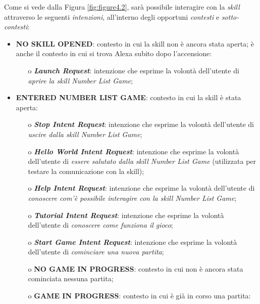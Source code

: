 Come si vede dalla Figura \ref{fig:figure4.2}, sarà possibile interagire con la
\textit{skill} attraverso le seguenti \textit{intenzioni}, all’interno degli
opportuni \textit{contesti} e \textit{sotto-contesti}:
\begin{itemize}
  \item \textbf{NO SKILL OPENED}: contesto in cui la skill non è ancora stata
        aperta; è anche il contesto in cui si trova Alexa subito dopo
        l’accensione:
        \begin{itemize}
          \item[o] \textit{\textbf{Launch Request}}: intenzione che esprime la
                volontà dell’utente di \textit{aprire la skill Number List
                Game};
        \end{itemize}
  \item \textbf{ENTERED NUMBER LIST GAME}: contesto in cui la skill è stata
        aperta:
        \begin{itemize}
          \item[o] \textit{\textbf{Stop Intent Request}}: intenzione che
                esprime la volontà dell’utente di \textit{uscire dalla skill
                Number List Game};
          \item[o] \textit{\textbf{Hello World Intent Request}}: intenzione che
                esprime la volontà dell’utente di \textit{essere salutato dalla
                skill Number List Game} (utilizzata per testare la
                comunicazione con la skill);
          \item[o] \textit{\textbf{Help Intent Request}}: intenzione che
                esprime la volontà dell’utente di \textit{conoscere com’è
                possibile interagire con la skill Number List Game};
          \item[o] \textit{\textbf{Tutorial Intent Request}}: intenzione che
                esprime la volontà dell’utente di \textit{conoscere come
                funziona il gioco};
          \item[o] \textit{\textbf{Start Game Intent Request}}: intenzione che
                esprime la volontà dell’utente di \textit{cominciare una nuova
                partita};
          \item[o] \textbf{NO GAME IN PROGRESS}: contesto in cui non è ancora
                stata cominciata nessuna partita;
          \item[o] \textbf{GAME IN PROGRESS}: contesto in cui è già in corso
                una partita:
                \begin{itemize}

\end{itemize}
\end{itemize}
\end{itemize}
